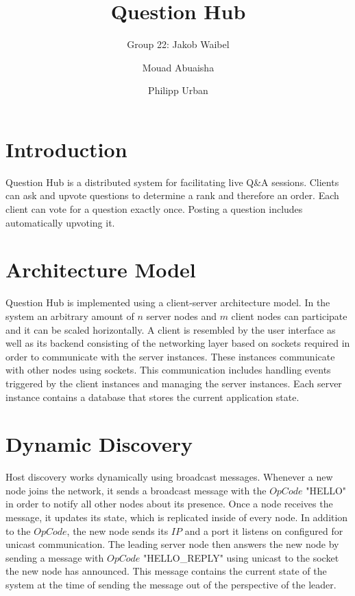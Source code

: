 \documentclass[runningheads]{llncs}
\begin{document}
%
\title{Question Hub}

\author{Group 22: Jakob Waibel \and Mouad Abuaisha \and Philipp Urban}

\institute{}
%
\maketitle              %

\section{Introduction}

Question Hub is a distributed system for facilitating live Q\&A sessions.
Clients can ask and upvote questions to determine a rank and therefore an order.
Each client can vote for a question exactly once.
Posting a question includes automatically upvoting it.

\section{Architecture Model}

Question Hub is implemented using a client-server architecture model.
In the system an arbitrary amount of $n$ server nodes and $m$ client nodes can participate and it can be scaled horizontally. 
A client is resembled by the user interface as well as its backend consisting of the networking layer based on sockets required in order to communicate with the server instances. 
These instances communicate with other nodes using sockets.
This communication includes handling events triggered by the client instances and managing the server instances.
Each server instance contains a database that stores the current application state.

 
\section{Dynamic Discovery}

Host discovery works dynamically using broadcast messages.
Whenever a new node joins the network, it sends a broadcast message with the $OpCode$ "HELLO" in order to notify all other nodes about its presence.
Once a node receives the message, it updates its state, which is replicated inside of every node.
In addition to the $OpCode$, the new node sends its $IP$ and a port it listens on configured for unicast communication.
The leading server node then answers the new node by sending a message with $OpCode$ "HELLO\_REPLY" using unicast to the socket the new node has announced.
This message contains the current state of the system at the time of sending the message out of the perspective of the leader.
 
\end{document}
